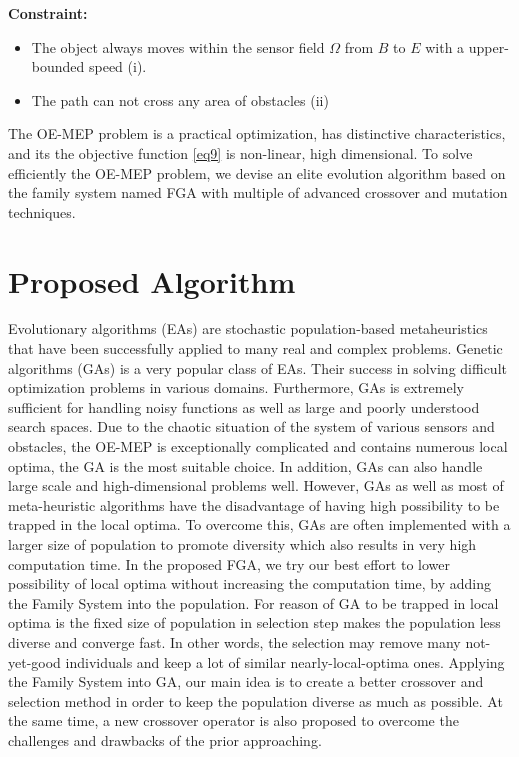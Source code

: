 \documentclass[final]{elsarticle}
\begin{document}
\textbf{Constraint:}	
\begin{itemize}
	\item The object always moves within the sensor field $\Omega $ from $B$ to $E$ with a upper-bounded speed (i).
	\item The path can not cross any area of obstacles  (ii)
\end{itemize}
	
The OE-MEP problem is a practical optimization, has distinctive characteristics, and its the objective function \eqref{eq9} is non-linear, high dimensional. To solve efficiently the OE-MEP problem, we devise an elite evolution algorithm based on the family system named FGA with multiple of advanced crossover and mutation techniques.

\section{Proposed Algorithm}
Evolutionary algorithms (EAs) are stochastic population-based metaheuristics that have been successfully applied to many real and complex problems. Genetic algorithms (GAs) is a very popular class of EAs. Their success in solving difficult optimization problems in various domains. Furthermore, GAs is extremely sufficient for handling noisy functions as well as large and poorly understood search spaces. Due to the chaotic situation of the system of various sensors and obstacles, the OE-MEP is exceptionally complicated and contains numerous local optima, the GA is the most suitable choice. In addition, GAs can also handle large scale and high-dimensional problems well. However, GAs as well as most of meta-heuristic algorithms have the disadvantage of having high possibility to be trapped in the local optima. To overcome this, GAs are often implemented with a larger size of population to promote diversity which also results in very high computation time. In the proposed FGA, we try our best effort to lower possibility of local optima without increasing the computation time, by adding the Family System into the population. For reason of GA to be trapped in local optima is the fixed size of population in selection step makes the population less diverse and converge fast. In other words, the selection may remove many not-yet-good individuals and keep a lot of similar nearly-local-optima ones. Applying the Family System into GA, our main idea is to create a better crossover and selection method in order to keep the population diverse as much as possible. At the same time, a new crossover operator is also proposed to overcome the challenges and drawbacks of the prior approaching.
\end{document}
